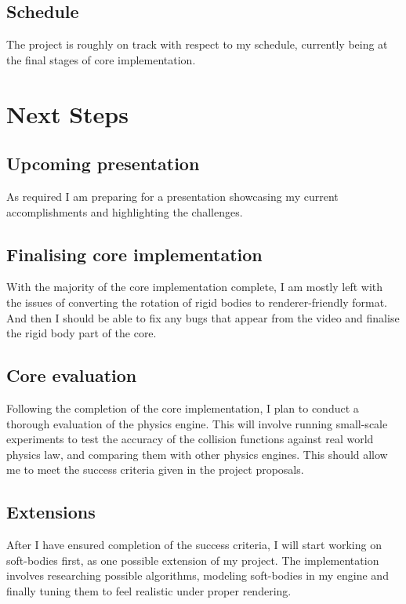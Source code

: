 \documentclass[12pt]{article}
\begin{document}
\subsection*{Schedule}

The project is roughly on track with respect to my schedule, currently being at the final stages of core implementation.

\section*{Next Steps}

\subsection*{Upcoming presentation}

As required I am preparing for a presentation showcasing my current accomplishments and highlighting the challenges.

\subsection*{Finalising core implementation} 

With the majority of the core implementation complete, I am mostly left with the issues of converting the rotation of rigid bodies to renderer-friendly format. And then I should be able to fix any bugs that appear from the video and finalise the rigid body part of the core.

\subsection*{Core evaluation}

Following the completion of the core implementation, I plan to conduct a thorough evaluation of the physics engine. This will involve running small-scale experiments to test the accuracy of the collision functions against real world physics law, and comparing them with other physics engines. This should allow me to meet the success criteria given in the project proposals.

\subsection*{Extensions}

After I have ensured completion of the success criteria, I will start working on soft-bodies first, as one possible extension of my project. The implementation involves researching possible algorithms, modeling soft-bodies in my engine and finally tuning them to feel realistic under proper rendering.
\end{document}
